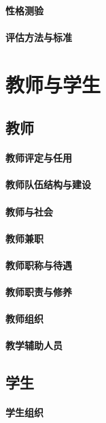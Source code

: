 \documentclass[UTF8]{../../ApplicationUniverse}
\begin{document}
    \subsubsection{性格测验}
    \subsubsection{评估方法与标准}



\chapter{教师与学生}
\section{教师}
    \subsubsection{教师评定与任用}
    \subsubsection{教师队伍结构与建设}
    \subsubsection{教师与社会}
    \subsubsection{教师兼职}
    \subsubsection{教师职称与待遇}
    \subsubsection{教师职责与修养}
    \subsubsection{教师组织}
    \subsubsection{教学辅助人员}
\section{学生}
    \subsubsection{学生组织}
\end{document}
